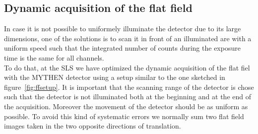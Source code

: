 \subsection{Dynamic acquisition of the flat field}

In case it is not possible to uniformely illuminate the detector due to its large dimensions, one of the solutions is to scan it in front of an illuminated are with a uniform speed such that the integrated number of counts during the exposure time is the same for all channels.\\

To do that, at the SLS we have optimized the dynamic acquisition of the flat fiel with the MYTHEN detector using a setup similar to the one sketched in figure~\ref{fig:ffsetup}.
It is important that the scanning range of the detector is chose such that the detector is not illuminated both at the beginning and at the end of the acquisition. Moreover the movement of the detector should be as uniform as possible. To avoid this kind of systematic errors we normally sum two flat field images taken in the two opposite directions of translation.\\

